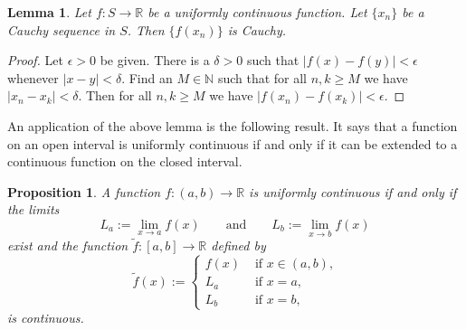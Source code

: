 \documentclass[12pt]{book}
\newcommand{\abs}[1]{\left\lvert {#1} \right\rvert}
\newcommand{\R}{{\mathbb{R}}}
\newcommand{\N}{{\mathbb{N}}}
\theoremstyle{plain}
\newtheorem{lemma}[thm]{Lemma}
\newtheorem{prop}[thm]{Proposition}
\theoremstyle{remark}
\theoremstyle{definition}
\theoremstyle{exercise}
\theoremstyle{example}
\begin{document}
\begin{lemma} \label{unifcauchycauchy:lemma}
Let $f \colon S \to \R$ be a uniformly continuous function.  Let
$\{ x_n \}$ be a Cauchy sequence in $S$.  Then $\{ f(x_n) \}$ is Cauchy.
\end{lemma}

\begin{proof}
Let $\epsilon > 0$ be given.  There is a $\delta > 0$ such that
$\abs{f(x)-f(y)} < \epsilon$ whenever $\abs{x-y} < \delta$.  Find an $M
\in \N$ such that for all $n, k \geq M$ we have $\abs{x_n-x_k} < \delta$.
Then for all $n, k \geq M$ we have $\abs{f(x_n)-f(x_k)} < \epsilon$.
\end{proof}

An application of the above lemma is the following result.  It says that
a function on an open interval is uniformly continuous if and only if
it can be extended to a continuous function on the closed interval.

\begin{prop} \label{context:prop}
A function $f \colon (a,b) \to \R$ is uniformly continuous if and only if
the limits 
\begin{equation*}
L_a := \lim_{x \to a} f(x) \qquad \text{and} \qquad
L_b := \lim_{x \to b} f(x)
\end{equation*}
exist and the function $\widetilde{f} \colon [a,b] \to \R$
defined by
\begin{equation*}
\widetilde{f}(x) :=
\begin{cases}
f(x) & \text{ if $x \in (a,b)$,} \\
L_a & \text{ if $x = a$,} \\
L_b & \text{ if $x = b$,}
\end{cases}
\end{equation*}
is continuous.
\end{prop}
\end{document}

